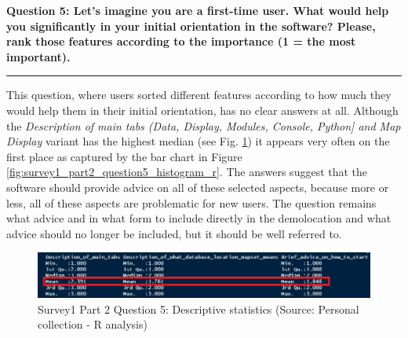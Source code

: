 \documentclass[a4paper,10pt,twoside]{article}
\begin{document}
\newpage
\noindent \textbf{Question 5: Let's imagine you are a first-time user. What would help you significantly in your initial orientation in the software? Please, rank those features according to the importance (1 = the most important).}
\par\noindent\rule{\textwidth}{0.4pt}
\noindent This question, where users sorted different features according to how much they would help them in their initial orientation, has no clear answers at all. Although the \textit{Description of main tabs (Data, Display, Modules, Console, Python] and Map Display} variant has the highest median (see Fig. \ref{fig:survey1_part2_question5_stats}) it appears very often on the first place as captured by the bar chart in Figure \ref{fig:survey1_part2_question5_histogram_r}. The answers suggest that the software should provide advice on all of these selected aspects, because more or less, all of these aspects are problematic for new users. The question remains what advice and in what form to include directly in the demolocation and what advice should no longer be included, but it should be well referred to.
    
\vspace{0.3cm}
\begin{figure}[hbt!] 
\begin{center}
\includegraphics[width=16cm]{../surveys/analyzed_data/survey1_part2_question5_stats.png} 
\caption[Survey1 Part 2 Question 5: Descriptive statistics]{Survey1 Part 2 Question 5: Descriptive statistics (Source: Personal collection - R analysis)}
\label{fig:survey1_part2_question5_stats}
\end{center}
\end{figure}
\end{document}
